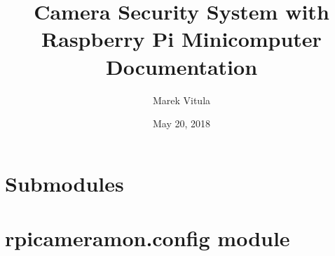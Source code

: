 \documentclass[letterpaper,10pt,english]{sphinxmanual}
\title{Camera Security System with Raspberry Pi Minicomputer Documentation}
\date{May 20, 2018}
\author{Marek Vitula}
\begin{document}
\maketitle
\tableofcontents
{}\label{rpicameramon::doc}



\chapter{Submodules}
\label{rpicameramon:submodules}\label{rpicameramon:rpicameramon-package}

\chapter{rpicameramon.config module}
\label{rpicameramon:module-rpicameramon.config}\label{rpicameramon:rpicameramon-config-module}
\end{document}
